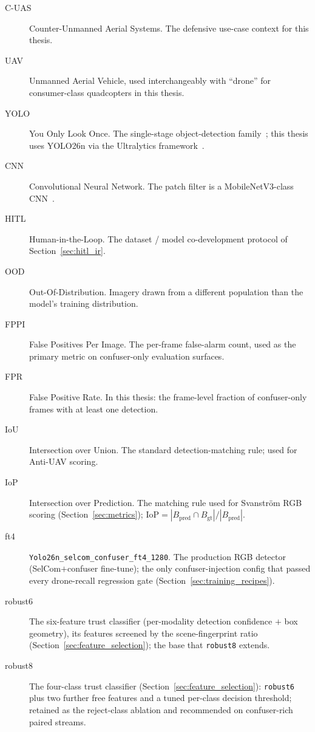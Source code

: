 \begin{description}
    \item[C-UAS] Counter-Unmanned Aerial Systems. The defensive use-case context for this thesis.
    \item[UAV] Unmanned Aerial Vehicle, used interchangeably with ``drone'' for consumer-class quadcopters in this thesis.
    \item[YOLO] You Only Look Once. The single-stage object-detection family~\cite{redmon2016yolo}; this thesis uses YOLO26n via the Ultralytics framework~\cite{ultralytics2024}.
    \item[CNN] Convolutional Neural Network. The patch filter is a MobileNetV3-class CNN~\cite{howard2019mobilenetv3}.
    \item[HITL] Human-in-the-Loop. The dataset / model co-development protocol of Section~\ref{sec:hitl_ir}.
    \item[OOD] Out-Of-Distribution. Imagery drawn from a different population than the model's training distribution.
    \item[FPPI] False Positives Per Image. The per-frame false-alarm count, used as the primary metric on confuser-only evaluation surfaces.
    \item[FPR] False Positive Rate. In this thesis: the frame-level fraction of confuser-only frames with at least one detection.
    \item[IoU] Intersection over Union. The standard detection-matching rule; used for Anti-UAV scoring.
    \item[IoP] Intersection over Prediction. The matching rule used for Svanstr\"om RGB scoring (Section~\ref{sec:metrics}); $\text{IoP} = |B_\text{pred} \cap B_\text{gt}| / |B_\text{pred}|$.
    \item[ft4] \texttt{Yolo26n\_selcom\_confuser\_ft4\_1280}. The production RGB detector (SelCom$+$confuser fine-tune); the only confuser-injection config that passed every drone-recall regression gate (Section~\ref{sec:training_recipes}).
    \item[robust6] The six-feature trust classifier (per-modality detection confidence $+$ box geometry), its features screened by the scene-fingerprint ratio (Section~\ref{sec:feature_selection}); the base that \texttt{robust8} extends.
    \item[robust8] The four-class trust classifier (Section~\ref{sec:feature_selection}): \texttt{robust6} plus two further free features and a tuned per-class decision threshold; retained as the reject-class ablation and recommended on confuser-rich paired streams.

\end{description}

